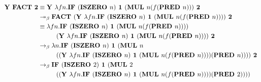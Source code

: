 \begin{align*}
\textbf{Y FACT 2} &\equiv \textbf{Y }\lambda f n. \textbf{IF } (\textbf{ISZERO } n) \textbf{ 1 } (\textbf{MUL } n  (f (\textbf{PRED } n))) \textbf{ 2} \\
&\twoheadrightarrow_{\beta} \textbf{FACT }( \textbf{Y }\lambda f n. \textbf{IF } (\textbf{ISZERO } n ) \textbf{ 1 } (\textbf{MUL } n (f (\textbf{PRED } n))) ) \textbf{ 2} \\
&\equiv \lambda f n. \textbf{IF } (\textbf{ISZERO } n) \textbf{ 1 } (\textbf{MUL } n  (f (\textbf{PRED } n))) ) \\
	& \hspace{10 mm} ( \textbf{Y }\lambda f n. \textbf{IF } (\textbf{ISZERO } n ) \textbf{ 1 } (\textbf{MUL } n (f (\textbf{PRED } 	n))) ) \textbf{ 2 }\\
&\rightarrow_{\beta} \lambda n. \textbf{IF } (\textbf{ISZERO } n) \textbf{ 1 } (\textbf{MUL } n \\
	& \hspace{10 mm} (( \textbf{Y }\lambda f n. \textbf{IF } (\textbf{ISZERO } n ) \textbf{ 1 } (\textbf{MUL } n (f (\textbf{PRED  	} n))) )  (\textbf{PRED } n))) ) \textbf{ 2 }\\
&\rightarrow_{\beta} \textbf{IF } (\textbf{ISZERO } 2) \textbf{ 1 } (\textbf{MUL } 2 \\
	& \hspace{10 mm} (( \textbf{Y }\lambda f n. \textbf{IF } (\textbf{ISZERO } n ) \textbf{ 1 } (\textbf{MUL } n (f (\textbf{PRED  	} n))) )  (\textbf{PRED } 2))) )
\end{align*}


